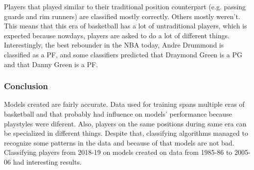 \documentclass[a4paper]{article}
\begin{document}
Players that played similar to their traditional position counterpart (e.g. passing guards and rim runners) are classified mostly correctly. Others mostly weren't. This means that this era of basketball has a lot of untraditional players, which is expected because nowdays, players are asked to do a lot of different things. Interestingly, the best rebounder in the NBA today, Andre Drummond is classified as a PF, and some classifiers predicted that Draymond Green is a PG and that Danny Green is a PF. 

\subsubsection{Conclusion}
\label{subsubsec:pos_clf_conclusion}

Models created are fairly accurate. Data used for training spans multiple eras of basketball and that probably had influence on models' performance because playstyles were diferent. Also, players on the same positions during same era can be specialized in different things. Despite that, classifying algorithms managed to recognize some patterns in the data and because of that models are not bad. Classifying players from 2018-19 on models created on data from 1985-86 to 2005-06 had interesting results. 

\pagebreak

\appendix


\appendix
\end{document}
